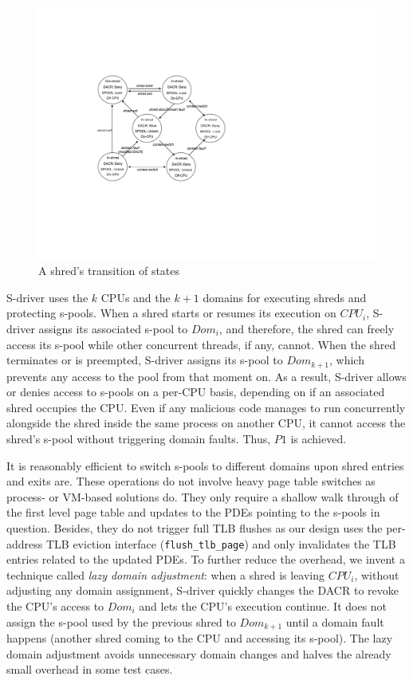 \begin{figure}[t]
\begin{minipage}[b]{0.4\textwidth}
		\includegraphics[width=\textwidth]{shreds/figures/shred_state_transition}
		\caption{A shred's transition of states}
		\label{fig:shredstat}
	\end{minipage}
\end{figure}

S-driver uses the $k$ CPUs and the $k+1$ domains for executing shreds and protecting s-pools. 
When a shred starts or resumes its execution on $CPU_{i}$, S-driver assigns its associated s-pool to $Dom_{i}$, and therefore, the shred can freely access its s-pool while other concurrent threads, if any, cannot. 
When the shred terminates or is preempted, S-driver assigns its s-pool to $Dom_{k+1}$, which prevents any access to the pool from that moment on. 
As a result, S-driver allows or denies access to s-pools on a per-CPU basis, depending on if an associated shred occupies the CPU. 
Even if any malicious code manages to run concurrently alongside the shred inside the same process on another CPU, it cannot access the shred's s-pool without triggering domain faults. Thus, $P1$ is achieved. 

It is reasonably efficient to switch s-pools to different domains upon shred entries and exits are. These operations do not involve heavy page table switches as process- or VM-based solutions do. They only require a shallow walk through of the first level page table and updates to the PDEs pointing to the s-pools in question. Besides, they do not trigger full TLB flushes as our design uses the per-address TLB eviction interface ({\tt flush\_tlb\_page}) and only invalidates the TLB entries related to the updated PDEs. 
To further reduce the overhead, we invent a technique called {\em lazy domain adjustment}: when a shred is leaving $CPU_{i}$, without adjusting any domain assignment, S-driver quickly changes the DACR to revoke the CPU's access to $Dom_{i}$ and lets the CPU's execution continue. It does not assign the s-pool used by the previous shred to $Dom_{k+1}$ until a domain fault happens (\ie another shred coming to the CPU and accessing its s-pool). The lazy domain adjustment avoids unnecessary domain changes and halves the already small overhead in some test cases.

